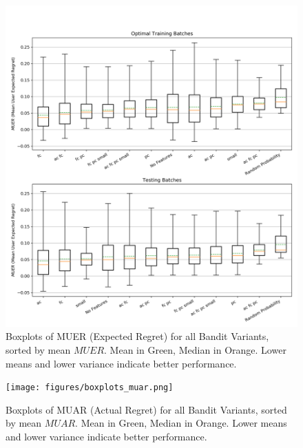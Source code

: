 \begin{figure}[H]
\includegraphics[width=1.25\textwidth,center]{figures/boxplots_muer.png}%
\caption{Boxplots of MUER (Expected Regret) for all Bandit Variants, sorted by mean $MUER$.  Mean in Green, Median in Orange.  Lower means and lower variance indicate better performance.}
\label{Boxplots of MUER for all Bandit Variants, sorted by mean MUER}
\end{figure}
\begin{figure}[H]
\texttt{[image: figures/boxplots\_muar.png]}%
\caption{Boxplots of MUAR (Actual Regret) for all Bandit Variants, sorted by mean $MUAR$.  Mean in Green, Median in Orange.  Lower means and lower variance indicate better performance.}
\label{Boxplots of MUAR for all Bandit Variants, sorted by mean MUAR}
\end{figure}




